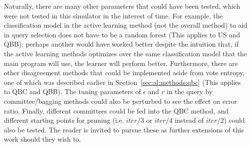 Naturally, there are many other parameters that could have been tested, which 
were not tested in this simulator in the interest of time. For 
example, the classification model in the active learning method (not the 
overall method) to aid in query selection does not have to be a random forest 
(This applies to US and QBB); perhaps another would have worked better despite 
the intuition that, if the active learning methods optimizes over the same 
classification model that the main program will use, the learner will perform 
better. Furthermore, there are other disagreement methods 
that could be implemented aside from vote entropy, one of which was described 
earlier in Section~\ref{sec:al:methods:qbc} (This applies to QBC and QBB). The 
tuning parameters of $\epsilon$ and $r$ in the query by committee/bagging 
methods could also be perturbed to see the effect on error ratio. Finally, 
different committees could be fed into the QBC method, and different starting 
points for pruning (i.e. $iter/3$ or $iter/4$ instead of $iter/2$) could also 
be tested. The reader is invited to pursue these as further extensions of this 
work should they wish to.